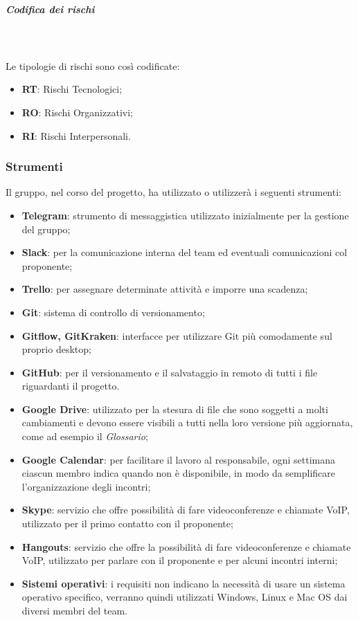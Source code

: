 			\noindent
			\subparagraph{Codifica dei rischi} \mbox{}\\ \mbox{}\\
				Le tipologie di rischi sono così codificate:
				\begin{itemize}
					\item \textbf{RT}: Rischi Tecnologici;
					\item \textbf{RO}: Rischi Organizzativi;
					\item \textbf{RI}: Rischi Interpersonali.
				\end{itemize}

		\subsubsection{Strumenti}
		Il gruppo, nel corso del progetto, ha utilizzato o utilizzerà i seguenti strumenti:
		\begin{itemize}
			\item \textbf{Telegram\glo}: strumento di messaggistica utilizzato inizialmente per la gestione del gruppo;
			\item \textbf{Slack\glo}: per la comunicazione interna del team ed eventuali comunicazioni col proponente;
			\item \textbf{Trello}: per assegnare determinate attività e imporre una scadenza;
			\item \textbf{Git}: sistema di controllo di versionamento;
			\item \textbf{Gitflow, GitKraken}: interfacce per utilizzare Git più comodamente sul proprio desktop;
			\item \textbf{GitHub}: per il versionamento e il salvataggio in remoto di tutti i file riguardanti il progetto.
			\item \textbf{Google Drive}: utilizzato per la stesura di file che sono soggetti a molti cambiamenti e devono essere visibili a tutti nella loro versione più aggiornata, come ad esempio il \textit{Glossario};
			\item \textbf{Google Calendar}: per facilitare il lavoro al responsabile, ogni settimana ciascun membro indica quando non è disponibile, in modo da semplificare l'organizzazione degli incontri;
			\item \textbf{Skype}: servizio che offre possibilità di fare videoconferenze e chiamate VoIP, utilizzato per il primo contatto con il proponente;
			\item \textbf{Hangouts}: servizio che offre la possibilità di fare videoconferenze e chiamate VoIP, utilizzato per parlare con il proponente e per alcuni incontri interni;
			\item \textbf{Sistemi operativi}: i requisiti non indicano la necessità di usare un sistema operativo specifico, verranno quindi utilizzati Windows, Linux e Mac OS dai diversi membri del team. %
		\end{itemize}
	